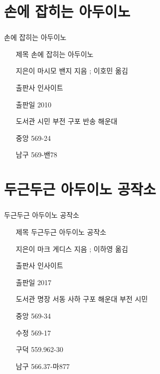 \documentclass[aspectratio=1610,14pt,xcolor=pdftex,dvipsnames,table,handout]{beamer}
\begin{document}
		\section{ 손에 잡히는 아두이노}
		\begin{frame} [t,plain]
		\frametitle{}
			\begin{block} { 손에 잡히는 아두이노}
			\setlength{\leftmargini}{4em}			
			\begin{itemize}
				\item [제목]  	손에 잡히는 아두이노
				\item [지은이]	마시모 밴지 지음 ; 이호민 옮김
				\item [출판사]	인사이트
				\item [출판일]	2010

				\item [도서관] 	시민 부전 구포 반송 해운대
				\item [중앙]		569-24
				\item [남구]		569-밴78
			\end{itemize}
			\end{block}						
								
		\end{frame}						

		\section{ 두근두근 아두이노 공작소 }
		\begin{frame} [t,plain]
		\frametitle{}
			\begin{block} { 두근두근 아두이노 공작소 }
			\setlength{\leftmargini}{4em}			
			\begin{itemize}
				\item [제목]  	두근두근 아두이노 공작소 
				\item [지은이]	마크 게디스 지음 ; 이하영 옮김
				\item [출판사]	인사이트
				\item [출판일]	2017

				\item [도서관] 	명장 서동 사하 구포 해운대 부전 시민
				\item [중앙]		569-34
				\item [수정]		569-17
				\item [구덕]		559.962-30
				\item [남구]		566.37-마877
  			\end{itemize}
			\end{block}						
								
		\end{frame}						
\end{document}

